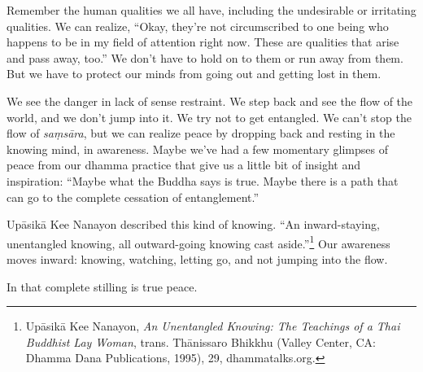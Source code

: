Remember the human qualities we all have, including the undesirable or irritating qualities. We can realize, ``Okay, they're not circumscribed to one being who happens to be in my field of attention right now. These are qualities that arise and pass away, too.'' We don't have to hold on to them or run away from them. But we have to protect our minds from going out and getting lost in them.

We see the danger in lack of sense restraint. We step back and see the flow of the world, and we don't jump into it. We try not to get entangled. We can't stop the flow of \emph{saṃsāra}, but we can realize peace by dropping back and resting in the knowing mind, in awareness. Maybe we've had a few momentary glimpses of peace from our dhamma practice that give us a little bit of insight and inspiration: ``Maybe what the Buddha says is true. Maybe there is a path that can go to the complete cessation of entanglement.''

Upāsikā Kee Nanayon described this kind of knowing. ``An inward-staying, unentangled knowing, all outward-going knowing cast aside.''\footnote{Upāsikā Kee Nanayon, \emph{An Unentangled Knowing: The Teachings of a Thai Buddhist Lay Woman}, trans. Thānissaro Bhikkhu (Valley Center, CA: Dhamma Dana Publications, 1995), 29, dhammatalks.org.} Our awareness moves inward: knowing, watching, letting go, and not jumping into the flow.

In that complete stilling is true peace.
